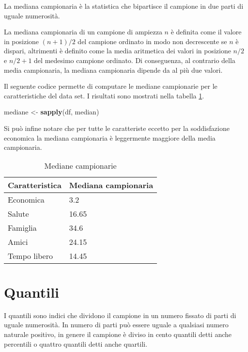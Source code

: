 \documentclass[]{book}
\newenvironment{Shaded}{\begin{snugshade}}{\end{snugshade}}
\newcommand{\KeywordTok}[1]{\textcolor[rgb]{0.13,0.29,0.53}{\textbf{#1}}}
\newcommand{\StringTok}[1]{\textcolor[rgb]{0.31,0.60,0.02}{#1}}
\newcommand{\NormalTok}[1]{#1}
\begin{document}
La mediana campionaria è la statistica che bipartisce il campione in due
parti di uguale numerosità.

La mediana campionaria di un campione di ampiezza \(n\) è definita come
il valore in posizione \((n+1)/2\) del campione ordinato in modo non
decrescente se \(n\) è dispari, altrimenti è definito come la media
aritmetica dei valori in posizione \(n/2\) e \(n/2 + 1\) del medesimo
campione ordinato. Di conseguenza, al contrario della media campionaria,
la mediana campionaria dipende da al più due valori.

Il seguente codice permette di computare le mediane campionarie per le
caratteristiche del data set. I risultati sono mostrati nella tabella
\ref{tab:mediana-campionaria}.

\begin{Shaded}
\begin{Highlighting}[]
\NormalTok{mediane <-}\StringTok{ }\KeywordTok{sapply}\NormalTok{(df, median)}
\end{Highlighting}
\end{Shaded}

Si può infine notare che per tutte le caratteriste eccetto per la
soddisfazione economica la mediana campionaria è leggermente maggiore
della media campionaria.

\begin{table}

\caption{\label{tab:mediana-campionaria}Mediane campionarie}
\centering
\begin{tabular}[t]{l|l}
\hline
Caratteristica & Mediana campionaria\\
\hline
Economica & 3.2\\
\hline
Salute & 16.65\\
\hline
Famiglia & 34.6\\
\hline
Amici & 24.15\\
\hline
Tempo libero & 14.45\\
\hline
\end{tabular}
\end{table}

\section{Quantili}\label{quantili}

I quantili sono indici che dividono il campione in un numero fissato di
parti di uguale numerosità. In numero di parti può essere uguale a
qualsiasi numero naturale positivo, in genere il campione è diviso in
cento quantili detti anche percentili o quattro quantili detti anche
quartili.
\end{document}
